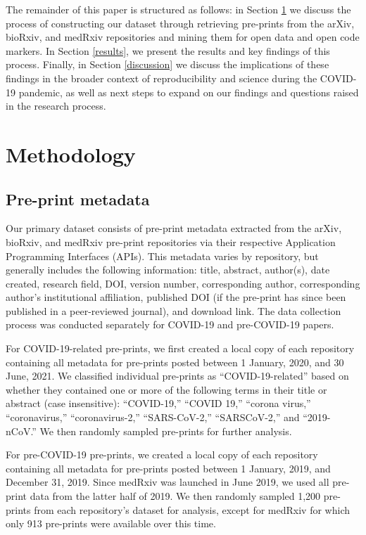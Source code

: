 \documentclass[
]{article}
\begin{document}
The remainder of this paper is structured as follows: in Section \ref{methodology} we discuss the process of constructing our dataset through retrieving pre-prints from the arXiv, bioRxiv, and medRxiv repositories and mining them for open data and open code markers. In Section \ref{results}, we present the results and key findings of this process. Finally, in Section \ref{discussion} we discuss the implications of these findings in the broader context of reproducibility and science during the COVID-19 pandemic, as well as next steps to expand on our findings and questions raised in the research process.

\hypertarget{methodology}{%
\section{Methodology}\label{methodology}}

\hypertarget{pre-print-metadata}{%
\subsection{Pre-print metadata}\label{pre-print-metadata}}

Our primary dataset consists of pre-print metadata extracted from the arXiv, bioRxiv, and medRxiv pre-print repositories via their respective Application Programming Interfaces (APIs). This metadata varies by repository, but generally includes the following information: title, abstract, author(s), date created, research field, DOI, version number, corresponding author, corresponding author's institutional affiliation, published DOI (if the pre-print has since been published in a peer-reviewed journal), and download link. The data collection process was conducted separately for COVID-19 and pre-COVID-19 papers.

For COVID-19-related pre-prints, we first created a local copy of each repository containing all metadata for pre-prints posted between 1 January, 2020, and 30 June, 2021.
We classified individual pre-prints as ``COVID-19-related'' based on whether they contained one or more of the following terms in their title or abstract (case insensitive): ``COVID-19,'' ``COVID 19,'' ``corona virus,'' ``coronavirus,'' ``coronavirus-2,'' ``SARS-CoV-2,'' ``SARSCoV-2,'' and ``2019-nCoV.'' We then randomly sampled pre-prints for further analysis.

For pre-COVID-19 pre-prints, we created a local copy of each repository containing all metadata for pre-prints posted between 1 January, 2019, and December 31, 2019. Since medRxiv was launched in June 2019, we used all pre-print data from the latter half of 2019. We then randomly sampled 1,200 pre-prints from each repository's dataset for analysis, except for medRxiv for which only 913 pre-prints were available over this time.
\end{document}
